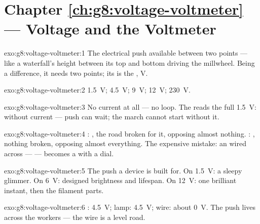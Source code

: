 \section*{Chapter \ref{ch:g8:voltage-voltmeter} --- Voltage and the Voltmeter}

\begin{solution}{exo:g8:voltage-voltmeter:1}
The electrical push available between two points --- like a
waterfall's height between its top and bottom driving the
millwheel. Being a difference, it needs two points; its  is
the , \unit{V}.
\end{solution}

\begin{solution}{exo:g8:voltage-voltmeter:2}
\qty{1.5}{V}; \qty{4.5}{V}; \qty{9}{V}; \qty{12}{V};
\qty{230}{V}.
\end{solution}

\begin{solution}{exo:g8:voltage-voltmeter:3}
No current at all --- no loop. The  reads the full
\qty{1.5}{V}:  without current --- push can wait; the
march cannot start without it.
\end{solution}

\begin{solution}{exo:g8:voltage-voltmeter:4}
: , the road broken for it, opposing almost
nothing. : , nothing broken, opposing almost
everything. The expensive mistake: an  wired across ---
 --- becomes a  with a dial.
\end{solution}

\begin{solution}{exo:g8:voltage-voltmeter:5}
The push a device is built for. On \qty{1.5}{V}: a sleepy
glimmer. On \qty{6}{V}: designed brightness and lifespan. On
\qty{12}{V}: one brilliant instant, then the filament parts.
\end{solution}

\begin{solution}{exo:g8:voltage-voltmeter:6}
: \qty{4.5}{V}; lamp: \qty{4.5}{V}; wire: about
\qty{0}{V}. The push lives across the workers --- the wire is a
level road.
\end{solution}

